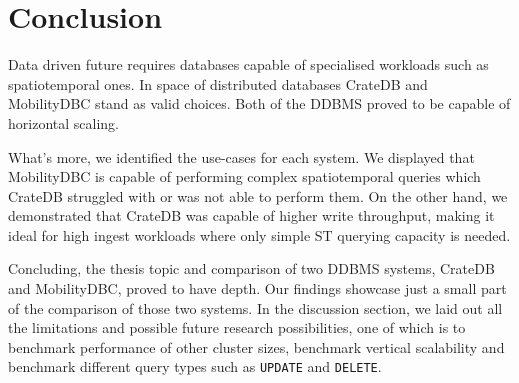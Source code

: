 \section{Conclusion}
\label{cha:conclusion}

Data driven future requires databases capable of specialised workloads such as spatiotemporal ones.
In space of distributed databases CrateDB and MobilityDBC stand as valid choices.
Both of the DDBMS proved to be capable of horizontal scaling.

What's more, we identified the use-cases for each system.
We displayed that MobilityDBC is capable of performing complex spatiotemporal queries which CrateDB struggled with or was not able to perform them.
On the other hand, we demonstrated that CrateDB was capable of higher write throughput, making it ideal for high ingest workloads where only simple ST querying capacity is needed.

Concluding, the thesis topic and comparison of two DDBMS systems, CrateDB and MobilityDBC, proved to have depth.
Our findings showcase just a small part of the comparison of those two systems.
In the discussion section, we laid out all the limitations and possible future research possibilities, one of which is to benchmark performance of other cluster sizes, benchmark vertical scalability and benchmark different query types such as \verb|UPDATE| and \verb|DELETE|.


